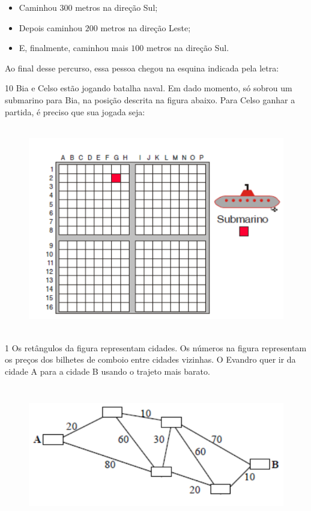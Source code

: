 \begin{itemize}
\item Caminhou $300$ metros na direção Sul;
\item Depois caminhou $200$ metros na direção Leste;
\item E, finalmente, caminhou mais $100$ metros na direção Sul.
\end{itemize}

Ao final desse percurso, essa pessoa chegou na esquina indicada pela
letra: 

\num{10} Bia e Celso estão jogando batalha naval. Em dado momento, só sobrou
um submarino para Bia, na posição descrita na figura abaixo. Para Celso ganhar a partida, é preciso que sua jogada seja:

\begin{figure}
\includegraphics[width=5in,height=3.55208in]{./imgSAEB_6_MAT/media/image73.png}
\end{figure}



\num{1}  Os retângulos da figura representam cidades. Os números na figura
representam os preços dos bilhetes de comboio entre cidades vizinhas. O
Evandro quer ir da cidade A para a cidade B usando o trajeto mais
barato.

\begin{figure}
\includegraphics[width=5.90625in,height=2.38542in]{./imgSAEB_6_MAT/media/image74.png}
\end{figure}

